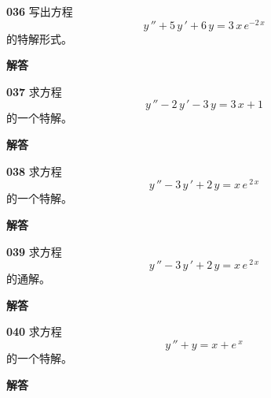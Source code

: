 \documentclass[a4paper,10pt]{article} %
\begin{document}


\textheight


\par\noindent \textbf{036} \quad 写出方程
$$y\,''+5\,y\,'+6\,y=3\,x\,e^{-2\,x}$$
的特解形式。
\par\noindent \textbf{ 解答}





\textheight


\par\noindent \textbf{037} \quad 求方程
$$y\,''-2\,y\,'-3\,y=3\,x+1$$
的一个特解。
\par\noindent \textbf{ 解答}





\textheight


\par\noindent \textbf{038} \quad 求方程
$$y\,''-3\,y\,'+2\,y=x\,e\,^{2\,x}$$
的一个特解。
\par\noindent \textbf{ 解答}





\textheight


\par\noindent \textbf{039} \quad 求方程
$$y\,''-3\,y\,'+2\,y=x\,e\,^{2\,x}$$
的通解。
\par\noindent \textbf{ 解答}





\textheight


\par\noindent \textbf{040} \quad 求方程
$$y\,''+y=x+e\,^x$$
的一个特解。
\par\noindent \textbf{ 解答}




\end{document}
